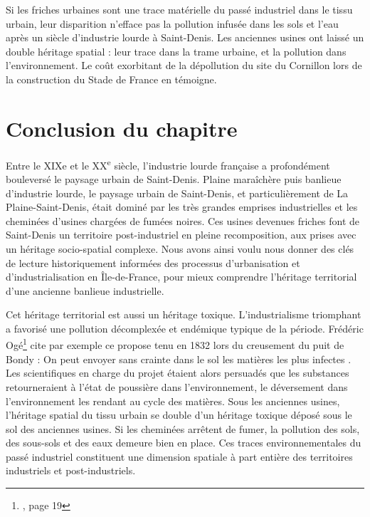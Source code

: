 \documentclass[a4paper,twoside,12pt]{book}
\newcommand{\siecle}[1]{\textsc{#1}\textsuperscript{e} siècle}
\begin{document}
Si les friches urbaines sont une trace matérielle du passé industriel dans le tissu urbain, leur disparition n'efface pas la pollution infusée dans les sols et l'eau après un siècle d'industrie lourde à Saint-Denis. Les anciennes usines ont laissé un double héritage spatial : leur trace dans la trame urbaine, et la pollution dans l'environnement. Le coût exorbitant de la dépollution du site du Cornillon lors de la construction du Stade de France en témoigne.
\section{Conclusion du chapitre}

Entre le XIXe et le \siecle{XX}, l'industrie lourde française a profondément bouleversé le paysage urbain de Saint-Denis. Plaine maraîchère puis banlieue d'industrie lourde, le paysage urbain de Saint-Denis, et particulièrement de La Plaine-Saint-Denis, était dominé par les très grandes emprises industrielles et les cheminées d'usines chargées de fumées noires. Ces usines devenues friches font de Saint-Denis un territoire post-industriel en pleine recomposition, aux prises avec un héritage socio-spatial complexe. Nous avons ainsi voulu nous donner des clés de lecture historiquement informées des processus d'urbanisation et d'industrialisation en Île-de-France, pour mieux comprendre l'héritage territorial d'une ancienne banlieue industrielle. 

Cet héritage territorial est aussi un héritage toxique. L'industrialisme triomphant a favorisé une pollution décomplexée et endémique typique de la période. Frédéric Ogé\footnote{\cite{oge_sites_2004}, page 19} cite par exemple ce propose tenu en 1832 lors du creusement du puit de Bondy : \og{} On peut envoyer sans crainte dans le sol les matières les plus infectes \fg{}. Les scientifiques en charge du projet étaient alors persuadés que les substances retourneraient à l’état de poussière dans l'environnement, le déversement dans l'environnement les rendant au cycle des matières. Sous les anciennes usines, l'héritage spatial du tissu urbain se double d'un héritage toxique déposé sous le sol des anciennes usines. Si les cheminées arrêtent de fumer, la pollution des sols, des sous-sols et des eaux demeure bien en place. Ces traces environnementales du passé industriel constituent une dimension spatiale à part entière des territoires industriels et post-industriels.
\end{document}
